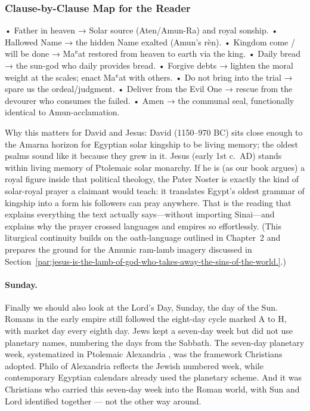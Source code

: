 \subsubsection{Clause-by-Clause Map for the Reader}

• Father in heaven → Solar source (Aten/Amun-Ra) and royal sonship.
• Hallowed Name → the hidden Name exalted (Amun's rèn).
• Kingdom come / will be done → Maʿat restored from heaven to earth via the king.
• Daily bread → the sun-god who daily provides bread.
• Forgive debts → lighten the moral weight at the scales; enact Maʿat with others.
• Do not bring into the trial → spare us the ordeal/judgment.
• Deliver from the Evil One → rescue from the devourer who consumes the failed.
• Amen → the communal seal, functionally identical to Amun-acclamation.

Why this matters for David and Jesus: David (1150--970 BC) sits close enough to the Amarna horizon for Egyptian solar kingship to be living memory; the oldest psalms sound like it because they grew in it.
Jesus (early 1st c.~AD) stands within living memory of Ptolemaic solar monarchy.
If he is (as our book argues) a royal figure inside that political theology, the Pater Noster is exactly the kind of solar-royal prayer a claimant would teach: it translates Egypt’s oldest grammar of kingship into a form his followers can pray anywhere.
That is the reading that explains everything the text actually says---without importing Sinai---and explains why the prayer crossed languages and empires so effortlessly.
(This liturgical continuity builds on the oath-language outlined in Chapter~2 and prepares the ground for the Amunic ram-lamb imagery discussed in Section~\ref{par:jesus-is-the-lamb-of-god-who-takes-away-the-sins-of-the-world.}.)

\paragraph{Sunday.} Finally we should also look at the Lord's Day, Sunday, the day of the Sun.
Romans in the early empire still followed the eight-day cycle marked A to H, with market day every eighth day.
Jews kept a seven-day week but did not use planetary names, numbering the days from the Sabbath.
The seven-day planetary week, systematized in Ptolemaic Alexandria \cite[37.18--19]{cassiusdio:romanhistory}, was the framework Christians adopted.
Philo of Alexandria reflects the Jewish numbered week, while contemporary Egyptian calendars already used the planetary scheme.
And it was Christians who carried this seven-day week into the Roman world, with Sun and Lord identified together --- not the other way around.

